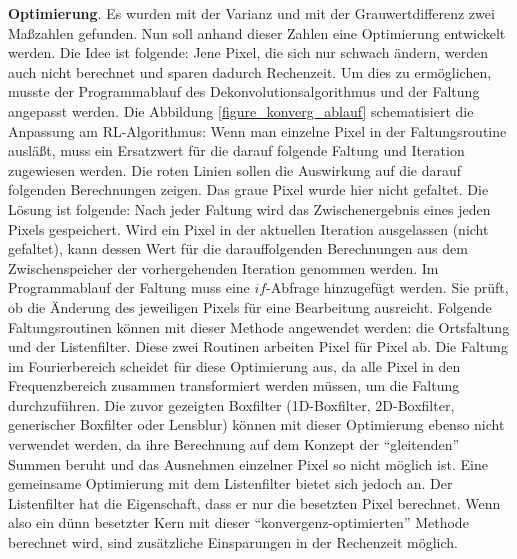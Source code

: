 \documentclass[a4paper,12pt]{article}
\begin{document}
\textbf{Optimierung}.
Es wurden mit der Varianz und mit der Grauwertdifferenz zwei Maßzahlen gefunden.
Nun soll anhand dieser Zahlen eine Optimierung entwickelt werden. Die Idee ist
folgende: Jene Pixel, die sich nur schwach ändern, werden auch nicht berechnet
und sparen dadurch Rechenzeit. Um dies zu ermöglichen, musste der Programmablauf
des Dekonvolutionsalgorithmus und der Faltung angepasst werden. Die Abbildung
\ref{figure_konverg_ablauf} schematisiert die Anpassung am RL-Algorithmus: Wenn
man einzelne Pixel in der Faltungsroutine ausläßt, muss ein Ersatzwert für die
darauf folgende Faltung und Iteration zugewiesen werden. Die roten Linien sollen
die Auswirkung auf die darauf folgenden Berechnungen zeigen. Das graue Pixel
wurde hier nicht gefaltet. Die Lösung ist folgende: Nach jeder Faltung wird das
Zwischenergebnis eines jeden Pixels gespeichert. Wird ein Pixel in der
aktuellen Iteration ausgelassen (nicht gefaltet), kann dessen Wert für die
darauffolgenden Berechnungen aus dem Zwischenspeicher der vorhergehenden
Iteration genommen werden. Im Programmablauf der Faltung muss eine
$if$-Abfrage hinzugefügt werden. Sie prüft, ob die Änderung des jeweiligen
Pixels für eine Bearbeitung ausreicht. Folgende Faltungsroutinen können mit
dieser Methode angewendet werden: die Ortsfaltung und der Listenfilter. Diese
zwei Routinen arbeiten Pixel für Pixel ab. Die Faltung im Fourierbereich
scheidet für diese Optimierung aus, da alle Pixel in den Frequenzbereich
zusammen transformiert werden müssen, um die Faltung durchzuführen. Die zuvor
gezeigten Boxfilter (1D-Boxfilter, 2D-Boxfilter, generischer Boxfilter oder
Lensblur) können mit dieser Optimierung ebenso nicht verwendet werden, da ihre
Berechnung auf dem Konzept der "`gleitenden"' Summen beruht und das Ausnehmen
einzelner Pixel so nicht möglich ist. Eine gemeinsame Optimierung mit dem
Listenfilter bietet sich jedoch an. Der Listenfilter hat die Eigenschaft, dass
er nur die besetzten Pixel berechnet. Wenn also ein dünn besetzter Kern mit
dieser "`konvergenz-optimierten"' Methode berechnet wird, sind zusätzliche
Einsparungen in der Rechenzeit möglich.
\end{document}
